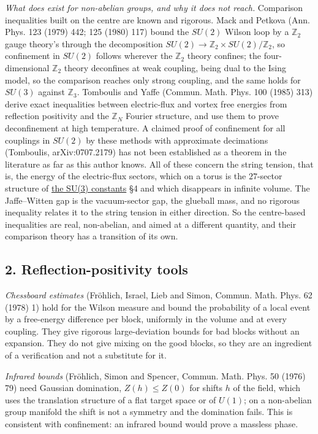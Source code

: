 \documentclass[11pt,a4paper]{article}
\begin{document}
\emph{What does exist for non-abelian groups, and why it does not
reach.} Comparison inequalities built on the centre are known and
rigorous. Mack and Petkova (Ann. Phys. 123 (1979) 442; 125 (1980) 117)
bound the \(SU(2)\) Wilson loop by a \(\mathbb Z_2\) gauge theory's
through the decomposition
\(SU(2)\to\mathbb Z_2\times SU(2)/\mathbb Z_2\), so confinement in
\(SU(2)\) follows wherever the \(\mathbb Z_2\) theory confines; the
four-dimensional \(\mathbb Z_2\) theory deconfines at weak coupling,
being dual to the Ising model, so the comparison reaches only strong
coupling, and the same holds for \(SU(3)\) against \(\mathbb Z_3\).
Tomboulis and Yaffe (Commun. Math. Phys. 100 (1985) 313) derive exact
inequalities between electric-flux and vortex free energies from
reflection positivity and the \(\mathbb Z_N\) Fourier structure, and use
them to prove deconfinement at high temperature. A claimed proof of
confinement for all couplings in \(SU(2)\) by these methods with
approximate decimations (Tomboulis, arXiv:0707.2179) has not been
established as a theorem in the literature as far as this author knows.
All of these concern the string tension, that is, the energy of the
electric-flux sectors, which on a torus is the \(27\)-sector structure
of \href{su3-constants.md}{the SU(3) constants} §4 and which disappears
in infinite volume. The Jaffe--Witten gap is the vacuum-sector gap, the
glueball mass, and no rigorous inequality relates it to the string
tension in either direction. So the centre-based inequalities are real,
non-abelian, and aimed at a different quantity, and their comparison
theory has a transition of its own.

\hypertarget{reflection-positivity-tools}{%
\subsection{2. Reflection-positivity
tools}\label{reflection-positivity-tools}}

\emph{Chessboard estimates} (Fröhlich, Israel, Lieb and Simon, Commun.
Math. Phys. 62 (1978) 1) hold for the Wilson measure and bound the
probability of a local event by a free-energy difference per block,
uniformly in the volume and at every coupling. They give rigorous
large-deviation bounds for bad blocks without an expansion. They do not
give mixing on the good blocks, so they are an ingredient of a
verification and not a substitute for it.

\emph{Infrared bounds} (Fröhlich, Simon and Spencer, Commun. Math. Phys.
50 (1976) 79) need Gaussian domination, \(Z(h)\le Z(0)\) for shifts
\(h\) of the field, which uses the translation structure of a flat
target space or of \(U(1)\); on a non-abelian group manifold the shift
is not a symmetry and the domination fails. This is consistent with
confinement: an infrared bound would prove a massless phase.
\end{document}
